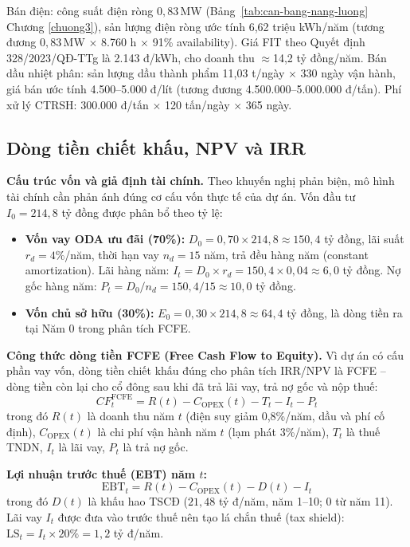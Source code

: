 \documentclass[../main.tex]{subfiles}
\begin{document}
Bán điện: công suất điện ròng $0{,}83$\,MW (Bảng~\ref{tab:can-bang-nang-luong} Chương \ref{chuong3}), sản lượng điện ròng ước tính 6,62 triệu kWh/năm (tương đương $0{,}83$\,MW $\times$ 8.760 h $\times$ 91\% availability). Giá FIT theo Quyết định 328/2023/QĐ-TTg là 2.143 đ/kWh, cho doanh thu $\approx$14,2 tỷ đồng/năm. Bán dầu nhiệt phân: sản lượng dầu thành phẩm 11,03 t/ngày $\times$ 330 ngày vận hành, giá bán ước tính 4.500--5.000 đ/lít (tương đương 4.500.000--5.000.000 đ/tấn). Phí xử lý CTRSH: 300.000 đ/tấn $\times$ 120 tấn/ngày $\times$ 365 ngày.

\subsection{Dòng tiền chiết khấu, NPV và IRR}
\label{sec:dong-tien-chiet-khau}

\textbf{Cấu trúc vốn và giả định tài chính.} Theo khuyến nghị phản biện, mô hình tài chính cần phản ánh đúng cơ cấu vốn thực tế của dự án. Vốn đầu tư $I_0 = 214{,}8$ tỷ đồng được phân bổ theo tỷ lệ:
\begin{itemize}
  \item \textbf{Vốn vay ODA ưu đãi (70\%):} $D_0 = 0{,}70 \times 214{,}8 \approx 150{,}4$ tỷ đồng, lãi suất $r_d = 4\%$/năm, thời hạn vay $n_d = 15$ năm, trả đều hàng năm (constant amortization). Lãi hàng năm: $I_t = D_0 \times r_d = 150{,}4 \times 0{,}04 \approx 6{,}0$ tỷ đồng. Nợ gốc hàng năm: $P_t = D_0 / n_d = 150{,}4 / 15 \approx 10{,}0$ tỷ đồng.
  \item \textbf{Vốn chủ sở hữu (30\%):} $E_0 = 0{,}30 \times 214{,}8 \approx 64{,}4$ tỷ đồng, là dòng tiền ra tại Năm 0 trong phân tích FCFE.
\end{itemize}

\textbf{Công thức dòng tiền FCFE (Free Cash Flow to Equity).} Vì dự án có cấu phần vay vốn, dòng tiền chiết khấu đúng cho phân tích IRR/NPV là FCFE -- dòng tiền còn lại cho cổ đông sau khi đã trả lãi vay, trả nợ gốc và nộp thuế:
\begin{equation}
  CF_t^{\text{FCFE}} = R(t) - C_{\text{OPEX}}(t) - T_t - I_t - P_t
  \label{eq:cft-fcfe}
\end{equation}
trong đó $R(t)$ là doanh thu năm $t$ (điện suy giảm 0,8\%/năm, dầu và phí cố định), $C_{\text{OPEX}}(t)$ là chi phí vận hành năm $t$ (lạm phát 3\%/năm), $T_t$ là thuế TNDN, $I_t$ là lãi vay, $P_t$ là trả nợ gốc.

\textbf{Lợi nhuận trước thuế (EBT) năm $t$:}
\begin{equation}
  \text{EBT}_t = R(t) - C_{\text{OPEX}}(t) - D(t) - I_t
  \label{eq:ebt-yearly}
\end{equation}
trong đó $D(t)$ là khấu hao TSCĐ ($21{,}48$ tỷ đ/năm, năm 1--10; 0 từ năm 11). Lãi vay $I_t$ được đưa vào trước thuế nên tạo lá chắn thuế (tax shield): $\text{LS}_t = I_t \times 20\% = 1{,}2$ tỷ đ/năm.
\end{document}
